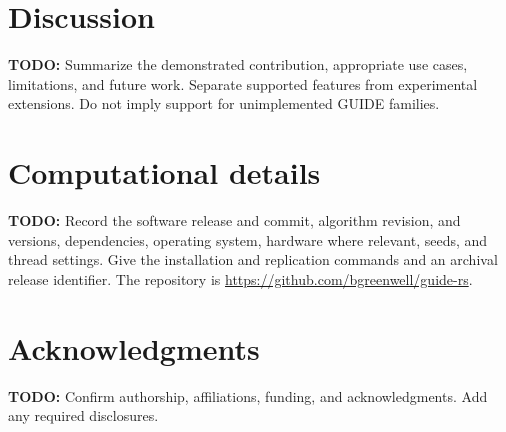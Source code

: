 \documentclass[article]{jss}
\newcommand{\todo}[1]{\textbf{TODO:} #1}
\begin{document}
\section{Discussion}\label{sec:discussion}

\todo{Summarize the demonstrated contribution, appropriate use cases,
limitations, and future work. Separate supported features from experimental
extensions. Do not imply support for unimplemented GUIDE families.}

\section*{Computational details}

\todo{Record the software release and commit, algorithm revision,
\proglang{Rust} and \proglang{Python} versions, dependencies, operating
system, hardware where relevant, seeds, and thread settings. Give the
installation and replication commands and an archival release identifier.
The repository is \url{https://github.com/bgreenwell/guide-rs}.}

\section*{Acknowledgments}

\todo{Confirm authorship, affiliations, funding, and acknowledgments.
Add any required disclosures.}

\clearpage


\end{document}
